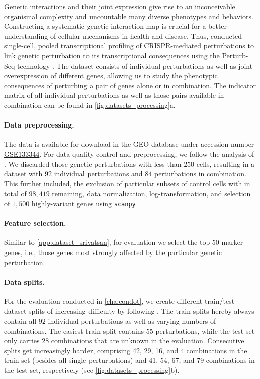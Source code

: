  Genetic interactions and their joint expression give rise to an inconceivable organismal complexity and uncountable many diverse phenotypes and behaviors.
Constructing a systematic genetic interaction map is crucial for a better understanding of cellular mechanisms in health and disease.
Thus, \citet{norman2019exploring} conducted single-cell, pooled transcriptional profiling of CRISPR-mediated perturbations to link genetic perturbation to its transcriptional consequences using the Perturb-Seq technology \citep{dixit2016perturb}.
The dataset consists of individual perturbations as well as joint overexpression of different genes, allowing us to study the phenotypic consequences of perturbing a pair of genes alone or in combination. The indicator matrix of all individual perturbations as well as those pairs available in combination can be found in \cref{fig:datasets_processing}a.

\paragraph{Data preprocessing.}
 The data is available for download in the \acrshort{GEO} database under accession number \href{https://www.ncbi.nlm.nih.gov/geo/query/acc.cgi?acc=GSE133344}{GSE133344}.
For data quality control and preprocessing, we follow the analysis of \citet{lotfollahi2021compositional}.
We discarded those genetic perturbations with less than $250$ cells, resulting in a dataset with $92$ individual perturbations and $84$ perturbations in combination.
This further included, the exclusion of particular subsets of control cells with in total of $98,419$ remaining, data normalization, log-transformation, and selection of $1,500$ highly-variant genes using \texttt{scanpy} \citep{wolf2018scanpy}.

\paragraph{Feature selection.}
Similar to \cref{app:dataset_srivatsan}, for evaluation we select the top $50$ marker genes, i.e., those genes most strongly affected by the particular genetic perturbation.

\paragraph{Data splits.} \label{app:datasplits}
For the evaluation conducted in \cref{cha:condot}, we create different train/test dataset splits of increasing difficulty by following \citet{lotfollahi2021compositional}.
The train splits hereby always contain all $92$ individual perturbations as well as varying numbers of combinations. The easiest train split contains 55 perturbations, while the test set only carries 28 combinations that are unknown in the evaluation. Consecutive splits get increasingly harder, comprising 42, 29, 16, and 4 combinations in the train set (besides all single perturbations) and 41, 54, 67, and 79 combinations in the test set, respectively (see \cref{fig:datasets_processing}b).

